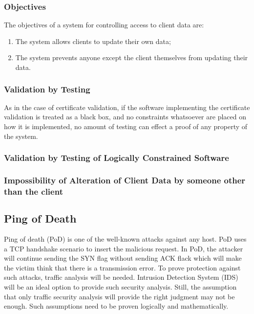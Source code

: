 \documentclass[journal]{IEEEtran}
\begin{document}
\subsubsection{Objectives}

The objectives of a system for controlling access to client data are:
\begin{enumerate}[DO-1]
  \item The system allows clients to update their own data;
  \item The system prevents anyone except the client themselves from updating their data.
\end{enumerate}

\subsubsection{Validation by Testing}

As in the case of certificate validation,
if the software implementing the certificate validation is treated
as a black box, and no constraints whatsoever are placed on how it is
implemented, no amount of testing can effect a proof of any
property of the system.

\subsubsection{Validation by Testing of Logically Constrained Software}

\subsubsection{Impossibility of Alteration of Client Data by someone other than the client}

\subsection{Ping of Death}
Ping of death (PoD) is one of the well-known attacks against any host. PoD uses a TCP handshake
scenario to insert the malicious request. In PoD, the attacker will continue sending the SYN flag
without sending ACK flack which will make the victim think that there is a transmission error. To
prove protection against such attacks, traffic analysis will be needed. Intrusion Detection System
(IDS) will be an ideal option to provide such security analysis. Still, the assumption that only
traffic security analysis will provide the right judgment may not be enough. Such assumptions need
to be proven logically and mathematically.
\end{document}
